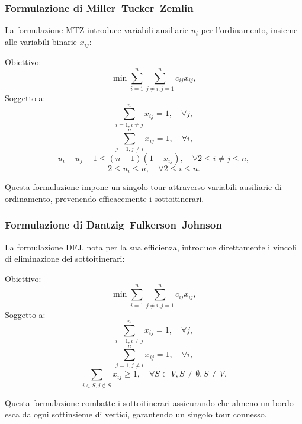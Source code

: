 \subsubsection{Formulazione di Miller–Tucker–Zemlin}

La formulazione \gls{MTZ} introduce variabili ausiliarie \(u_i\) per l'ordinamento, insieme alle variabili binarie \(x_{ij}\):

Obiettivo:
\[
	\min \sum_{i=1}^{n} \sum_{j \ne i, j=1}^{n} c_{ij} x_{ij},
\]
Soggetto a:
\[
	\sum_{i=1, i \ne j}^{n} x_{ij} = 1, \quad \forall j,
\]
\[
	\sum_{j=1, j \ne i}^{n} x_{ij} = 1, \quad \forall i,
\]
\[
	u_i - u_j + 1 \le (n-1)(1 - x_{ij}), \quad \forall 2 \le i \ne j \le n,
\]
\[
	2 \le u_i \le n, \quad \forall 2 \le i \le n.
\]

Questa formulazione impone un singolo tour attraverso variabili ausiliarie di ordinamento, prevenendo efficacemente i sottoitinerari.

\subsubsection{Formulazione di Dantzig–Fulkerson–Johnson}

La formulazione DFJ, nota per la sua efficienza, introduce direttamente i vincoli di eliminazione dei sottoitinerari:

Obiettivo:
\[
	\min \sum_{i=1}^{n} \sum_{j \ne i, j=1}^{n} c_{ij} x_{ij},
\]
Soggetto a:
\[
	\sum_{i=1, i \ne j}^{n} x_{ij} = 1, \quad \forall j,
\]
\[
	\sum_{j=1, j \ne i}^{n} x_{ij} = 1, \quad \forall i,
\]
\[
	\sum_{i \in S, j \notin S} x_{ij} \ge 1, \quad \forall S \subset V, S \ne \emptyset, S \ne V.
\]


Questa formulazione combatte i sottoitinerari assicurando che almeno un bordo esca da ogni sottinsieme di vertici, garantendo un singolo tour connesso.


